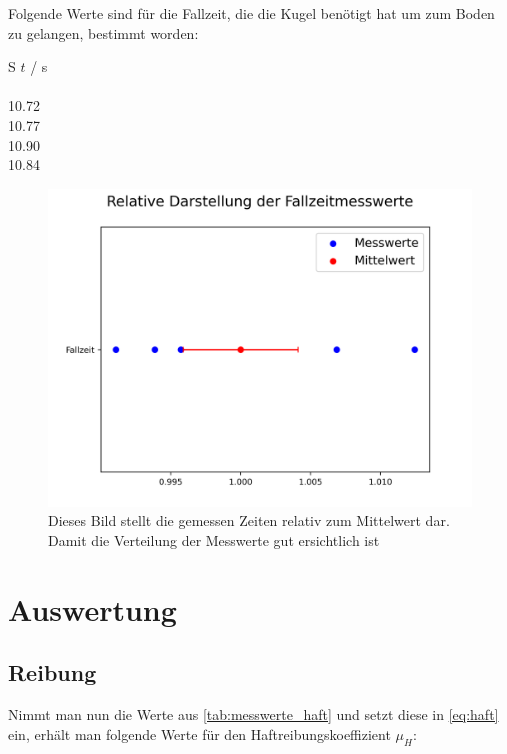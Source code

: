 \documentclass[11pt,ngerman]{scrartcl}
\begin{document}
Folgende Werte sind für die Fallzeit, die die Kugel
benötigt hat um zum Boden zu gelangen, bestimmt worden:


\begin{table}[H]
    \centering
    \caption{Die nötige Zeit $t$ die eine Stahlkugel (in Öl)
        braucht um von der Fallhöhe $h$ = \SI{500(2)}{\mm} zum
        Boden des Gefäßes zu gelangen. Die Zeitmessungen haben eine Unsicherheit
        von \SI{+-0.10}{\second}. Werte wurden aus der Vorgabe \cite{werteviskositat} entnommen.
}
    \label{tab:zeitmessungen_viskositat}
    \begin{tabular}{S}
        {$t$ / \si{\second}}  \\                 \\
         10.72                \\
         10.77                \\
         10.90                \\
         10.84                \\
    \end{tabular}
\end{table}

\begin{figure}[H]
    \centering
    \includegraphics[width=0.8\linewidth]{pics/Fallzeitmesswerte.png}
    \caption{Dieses Bild stellt die gemessen Zeiten relativ zum Mittelwert dar. Damit die Verteilung der
    Messwerte gut ersichtlich ist}%
    \label{fig:pics/Fallzeit}
\end{figure}
\section{Auswertung}
\label{sec:auswertung}

\subsection{Reibung}
Nimmt man nun die Werte aus \autoref{tab:messwerte_haft} und
setzt diese in \autoref{eq:haft} ein, erhält man folgende Werte
für den Haftreibungskoeffizient $\mu_H$:
\end{document}

